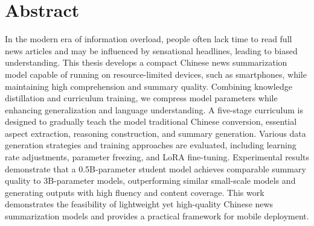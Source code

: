 
\fontsize{12}{18}\selectfont



{
 \chapter*{Abstract}
 }


In the modern era of information overload, people often lack time to read full news articles and may be influenced by sensational headlines, leading to biased understanding. This thesis develops a compact Chinese news summarization model capable of running on resource-limited devices, such as smartphones, while maintaining high comprehension and summary quality. Combining knowledge distillation and curriculum training, we compress model parameters while enhancing generalization and language understanding. A five-stage curriculum is designed to gradually teach the model traditional Chinese conversion, essential aspect extraction, reasoning construction, and summary generation. Various data generation strategies and training approaches are evaluated, including learning rate adjustments, parameter freezing, and LoRA fine-tuning. Experimental results demonstrate that a 0.5B-parameter student model achieves comparable summary quality to 3B-parameter models, outperforming similar small-scale models and generating outputs with high fluency and content coverage. This work demonstrates the feasibility of lightweight yet high-quality Chinese news summarization models and provides a practical framework for mobile deployment.

